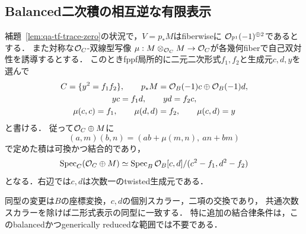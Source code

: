\subsection{Balanced二次積の相互逆な有限表示}

\begin{proposition}[二形式の再構成と結合律の自動性]
\label{prop:qa-tf-balanced-quadratic-inverse}
補題~\ref{lem:qa-tf-trace-zero}の状況で，$V=p_*M$はfiberwiseに
$\mathcal O_{\mathbb P^1}(-1)^{\oplus2}$であるとする．
また対称な$\mathcal O_C$-双線型写像
$\mu:M\otimes_{\mathcal O_C}M\to\mathcal O_C$が各幾何fiberで自己双対性を誘導するとする．
このときfppf局所的に二元二次形式$f_1,f_2$と生成元$c,d,y$を選んで
\[
 \begin{gathered}
 C=\{y^2=f_1f_2\},\qquad
 p_*M=\mathcal O_B(-1)c\oplus\mathcal O_B(-1)d,\\
 yc=f_1d,\qquad yd=f_2c,\\
 \mu(c,c)=f_1,\qquad\mu(d,d)=f_2,\qquad\mu(c,d)=y
 \end{gathered}
\]
と書ける．
従って$\mathcal O_C\oplus M$に
\[
 (a,m)(b,n)=(ab+\mu(m,n),\ an+bm)
\]
で定めた積は可換かつ結合的であり，
\begin{equation}
 \operatorname{Spec}_C(\mathcal O_C\oplus M)
 \simeq
 \operatorname{Spec}_B
 \mathcal O_B[c,d]/(c^2-f_1,d^2-f_2)
 \label{eq:qa-tf-reconstructed-cover}
\end{equation}
となる．右辺では$c,d$は次数一のtwisted生成元である．

同型の変更は$B$の座標変換，$c,d$の個別スカラー，二項の交換であり，
共通次数スカラーを除けば二形式表示の同型に一致する．
特に追加の結合律条件は，このbalancedかつgenerically reducedな範囲では不要である．
\end{proposition}
